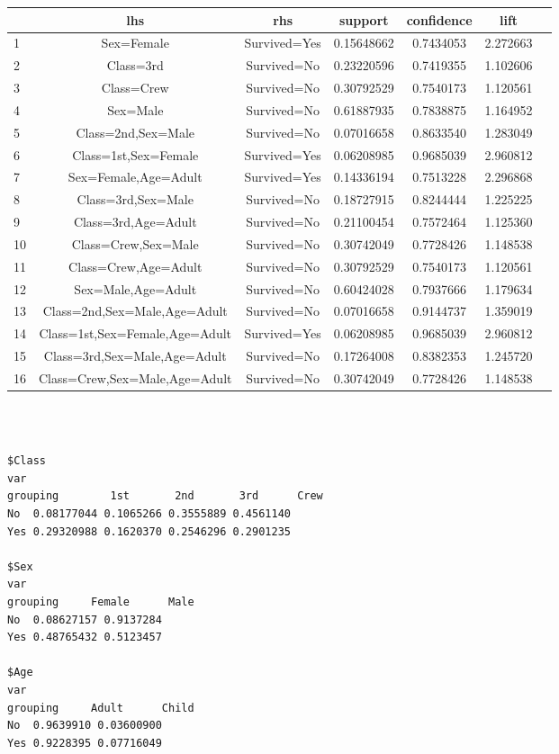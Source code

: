 \documentclass{article}
\begin{document}
\begin{tabular}{|l|*{6}{c|}}
	\hline
	&lhs&rhs&support&confidence&lift\\ \hline
1&{Sex=Female}&{Survived=Yes}&0.15648662&0.7434053&2.272663\\ \hline
2&{Class=3rd}&{Survived=No}&0.23220596&0.7419355&1.102606\\ \hline
3&{Class=Crew}&{Survived=No}&0.30792529&0.7540173&1.120561\\ \hline
4&{Sex=Male}&{Survived=No}&0.61887935&0.7838875&1.164952\\ \hline
5&{Class=2nd,Sex=Male}&{Survived=No}&0.07016658&0.8633540&1.283049\\ \hline
6&{Class=1st,Sex=Female}&{Survived=Yes}&0.06208985&0.9685039&2.960812\\ \hline
7&{Sex=Female,Age=Adult}&{Survived=Yes}&0.14336194&0.7513228&2.296868\\ \hline
8&{Class=3rd,Sex=Male}&{Survived=No}&0.18727915&0.8244444&1.225225\\ \hline
9&{Class=3rd,Age=Adult}&{Survived=No}&0.21100454&0.7572464&1.125360\\ \hline
10&{Class=Crew,Sex=Male}&{Survived=No}&0.30742049&0.7728426&1.148538\\ \hline
11&{Class=Crew,Age=Adult}&{Survived=No}&0.30792529&0.7540173&1.120561\\ \hline
12&{Sex=Male,Age=Adult}&{Survived=No}&0.60424028&0.7937666&1.179634\\ \hline
13&{Class=2nd,Sex=Male,Age=Adult}&{Survived=No}&0.07016658&0.9144737&1.359019\\ \hline
14&{Class=1st,Sex=Female,Age=Adult}&{Survived=Yes}&0.06208985&0.9685039&2.960812\\ \hline
15&{Class=3rd,Sex=Male,Age=Adult}&{Survived=No}&0.17264008&0.8382353&1.245720\\ \hline
16&{Class=Crew,Sex=Male,Age=Adult}&{Survived=No}&0.30742049&0.7728426&1.148538\\ \hline
\end{tabular}\\ \\ 
\begin{lstlisting}
$Class
var
grouping        1st       2nd       3rd      Crew
No  0.08177044 0.1065266 0.3555889 0.4561140
Yes 0.29320988 0.1620370 0.2546296 0.2901235

$Sex
var
grouping     Female      Male
No  0.08627157 0.9137284
Yes 0.48765432 0.5123457

$Age
var
grouping     Adult      Child
No  0.9639910 0.03600900
Yes 0.9228395 0.07716049
\end{lstlisting}
\end{document}
